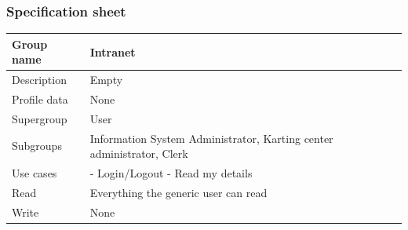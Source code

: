 \documentclass{beamer}
\begin{document}
\begin{frame}
    \frametitle{Specification sheet}
    \begin{table}
        \tiny
        \begin{tabular}{|p{2cm}|p{6cm}|}
        \hline
        Group name & \textbf{Intranet} \\
        \hline
        Description & Empty \\
        \hline
        Profile data & None \\
        Supergroup & User \\
        \hline
        Subgroups & Information System Administrator, Karting center administrator, Clerk \\
        \hline
        Use cases &
        - Login/Logout \newline
        - Read my details \\
        \hline
        Read & Everything the generic user can read\\
        \hline
        Write & None \\
        \hline
        \end{tabular}
    \end{table}
\end{frame}
\end{document}

